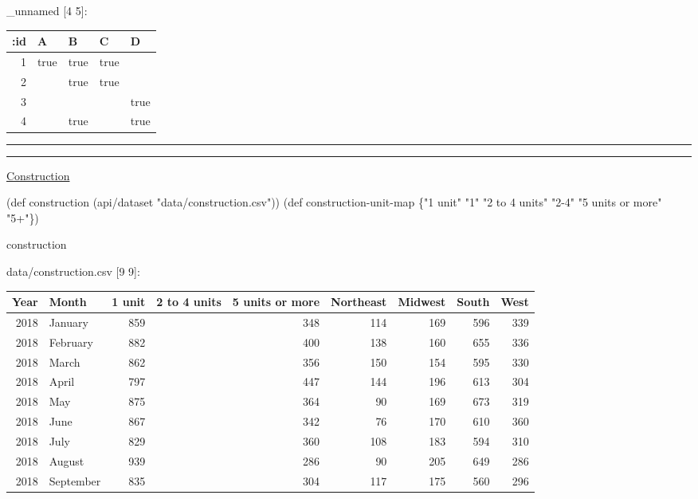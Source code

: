 \documentclass[]{article}
\newenvironment{Shaded}{\begin{snugshade}}{\end{snugshade}}
\newcommand{\StringTok}[1]{\textcolor[rgb]{0.31,0.60,0.02}{#1}}
\newcommand{\FunctionTok}[1]{\textcolor[rgb]{0.00,0.00,0.00}{#1}}
\newcommand{\BuiltInTok}[1]{#1}
\newcommand{\NormalTok}[1]{#1}
\begin{document}
\_unnamed {[}4 5{]}:

\begin{longtable}[]{@{}rllll@{}}
\toprule
:id & A & B & C & D\tabularnewline
\midrule
\endhead
1 & true & true & true &\tabularnewline
2 & & true & true &\tabularnewline
3 & & & & true\tabularnewline
4 & & true & & true\tabularnewline
\bottomrule
\end{longtable}

\begin{center}\rule{0.5\linewidth}{0.5pt}\end{center}

\begin{center}\rule{0.5\linewidth}{0.5pt}\end{center}

\href{https://tidyr.tidyverse.org/articles/pivot.html\#by-hand}{Construction}

\begin{Shaded}
\begin{Highlighting}[]
\NormalTok{(}\BuiltInTok{def}\FunctionTok{ construction }\NormalTok{(api/dataset }\StringTok{"data/construction.csv"}\NormalTok{))}
\NormalTok{(}\BuiltInTok{def}\FunctionTok{ construction-unit-map }\NormalTok{\{}\StringTok{"1 unit"} \StringTok{"1"}
                            \StringTok{"2 to 4 units"} \StringTok{"2-4"}
                            \StringTok{"5 units or more"} \StringTok{"5+"}\NormalTok{\})}
\end{Highlighting}
\end{Shaded}

\begin{Shaded}
\begin{Highlighting}[]
\NormalTok{construction}
\end{Highlighting}
\end{Shaded}

data/construction.csv {[}9 9{]}:

\begin{longtable}[]{@{}rlrlrrrrr@{}}
\toprule
Year & Month & 1 unit & 2 to 4 units & 5 units or more & Northeast &
Midwest & South & West\tabularnewline
\midrule
\endhead
2018 & January & 859 & & 348 & 114 & 169 & 596 & 339\tabularnewline
2018 & February & 882 & & 400 & 138 & 160 & 655 & 336\tabularnewline
2018 & March & 862 & & 356 & 150 & 154 & 595 & 330\tabularnewline
2018 & April & 797 & & 447 & 144 & 196 & 613 & 304\tabularnewline
2018 & May & 875 & & 364 & 90 & 169 & 673 & 319\tabularnewline
2018 & June & 867 & & 342 & 76 & 170 & 610 & 360\tabularnewline
2018 & July & 829 & & 360 & 108 & 183 & 594 & 310\tabularnewline
2018 & August & 939 & & 286 & 90 & 205 & 649 & 286\tabularnewline
2018 & September & 835 & & 304 & 117 & 175 & 560 & 296\tabularnewline
\bottomrule
\end{longtable}
\end{document}
